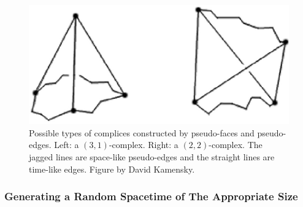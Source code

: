 \documentclass[12pt]{article}
\begin{document}
\begin{figure}[htb]
  \centering
  \includegraphics[width=\textwidth]{pseudo-face_complices.png}
  \caption{Possible types of complices constructed by pseudo-faces and
    pseudo-edges. Left: a $(3,1)$-complex. Right: a
    $(2,2)$-complex. The jagged lines are space-like pseudo-edges and
    the straight lines are time-like edges. Figure by David Kamensky.}
  \label{fig:pseudo-face-complices}
\end{figure}

\subsubsection{Generating a Random Spacetime of The Appropriate Size}
\label{sec:grow-spacetime}
\end{document}
